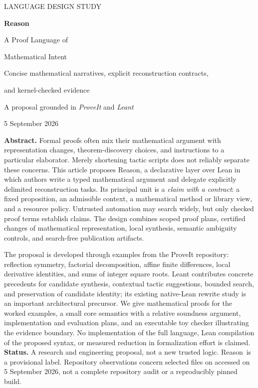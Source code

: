 \documentclass[11pt,a4paper]{article}
\newcommand{\Reason}{\textsf{Reason}}
\newcommand{\code}[1]{\texttt{\detokenize{#1}}}
\theoremstyle{remark}
\begin{document}
\begin{titlepage}
\vspace*{10mm}
{\sffamily\small\color{accent} LANGUAGE DESIGN STUDY\par}
\vspace{9mm}
{\sffamily\bfseries\color{ink}\fontsize{31}{37}\selectfont Reason\par}
\vspace{3mm}
{\sffamily\fontsize{22}{28}\selectfont A Proof Language of\par Mathematical Intent\par}
\vspace{7mm}
{\large Concise mathematical narratives, explicit reconstruction contracts,\par and kernel-checked evidence\par}
\vspace{9mm}
{\sffamily A proposal grounded in \textit{ProveIt} and \textit{Leant}\par}
\vspace{6mm}
{5 September 2026\par}
\vspace{10mm}
\noindent\textbf{Abstract.}
Formal proofs often mix their mathematical argument with representation changes, theorem-discovery choices, and instructions to a particular elaborator. Merely shortening tactic scripts does not reliably separate these concerns. This article proposes \Reason, a declarative layer over Lean in which authors write a typed mathematical argument and delegate explicitly delimited reconstruction tasks. Its principal unit is a \emph{claim with a contract}: a fixed proposition, an admissible context, a mathematical method or library view, and a resource policy. Untrusted automation may search widely, but only checked proof terms establish claims. The design combines scoped proof plans, certified changes of mathematical representation, local synthesis, semantic ambiguity controls, and search-free publication artifacts.

The proposal is developed through examples from the ProveIt repository: reflection symmetry, factorial decomposition, affine finite differences, local derivative identities, and sums of integer square roots. Leant contributes concrete precedents for candidate synthesis, contextual tactic suggestions, bounded search, and preservation of candidate identity; its existing native-Lean rewrite study is an important architectural precursor. We give mathematical proofs for the worked examples, a small core semantics with a relative soundness argument, implementation and evaluation plans, and an executable toy checker illustrating the evidence boundary. No implementation of the full language, Lean compilation of the proposed syntax, or measured reduction in formalization effort is claimed.
\vfill
\noindent\small\textbf{Status.} A research and engineering proposal, not a new trusted logic. \Reason\ is a provisional label. Repository observations concern selected files on \code{main} accessed on 5 September 2026, not a complete repository audit or a reproducibly pinned build.
\end{titlepage}
\setcounter{tocdepth}{1}
\hypersetup{bookmarksdepth=2}
\tableofcontents
\clearpage
\end{document}
